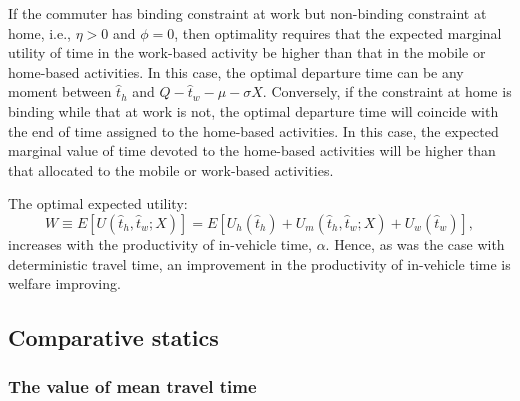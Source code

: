 \documentclass[12pt,a4paper,british]{article}
\begin{document}
If the commuter has binding constraint at work but non-binding constraint at home, i.e., $\eta>0$ and $\phi=0$, then optimality requires that the expected marginal utility of time in the work-based activity be higher than that in the mobile or home-based activities. In this case, the optimal departure time can be any moment between $\hat{t}_{h}$ and $Q-\hat{t}_{w}-\mu-\sigma X$. Conversely, if the constraint at home is binding while that at work is not, the optimal departure time will coincide with the end of time assigned to the home-based activities. In this case, the expected marginal value of time devoted to the home-based activities will be higher than that allocated to the mobile or work-based activities.

The optimal expected utility:
\begin{equation*}
W\equiv E\left[U\left(\hat{t}_{h},\hat{t}_{w}; X\right)\right] = E\left[ U_{h}\left(\hat{t}_{h} \right) + U_{m}\left(\hat{t}_{h},\hat{t}_{w}; X\right) + U_{w}\left(\hat{t}_{w}\right)\right],
\end{equation*}
increases with the productivity of in-vehicle time, $\alpha$. Hence, as was the case with deterministic travel time, an improvement in the productivity of in-vehicle time is welfare improving.


\subsection{Comparative statics}

\subsubsection*{The value of mean travel time}
\end{document}
